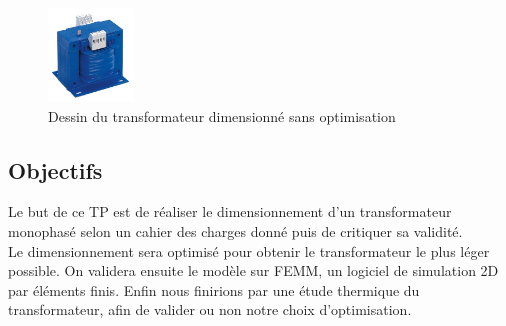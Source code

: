 \begin{figure}[ht]
	\begin{center}
	\includegraphics[width=0.2\textwidth]{images/TP_intro_transfo}
	\caption{Dessin du transformateur dimensionné sans optimisation}\label{img:dessinTransfoCarre}
	\end{center}
\end{figure}
\FloatBarrier 


\subsection{Objectifs}
Le but de ce TP est de réaliser le dimensionnement d'un transformateur monophasé selon un cahier des charges donné puis de critiquer sa validité.\\
Le dimensionnement sera optimisé pour obtenir le transformateur le plus léger possible. On validera ensuite le modèle sur FEMM, un logiciel de simulation 2D par éléments finis. Enfin nous finirions par une étude thermique du transformateur, afin de valider ou non notre choix d'optimisation.\\


